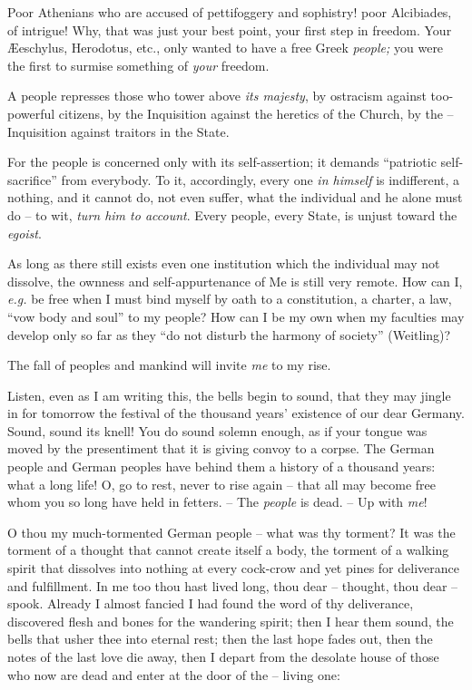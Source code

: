Poor Athenians who are accused of pettifoggery and sophistry! poor Alcibiades, 
of intrigue! Why, that was just your best point, your first step in freedom. 
Your \AE{}eschylus, Herodotus, etc., only wanted to have a free Greek 
\textit{people;} you were the first to surmise something of \textit{your} 
freedom.

A people represses those who tower above \textit{its majesty}, by ostracism 
against too-powerful citizens, by the Inquisition against the heretics of the 
Church, by the -- Inquisition against traitors in the State.

For the people is concerned only with its self-assertion; it demands 
``patriotic self-sacrifice'' from everybody. To it, accordingly, every one 
\textit{in himself} is indifferent, a nothing, and it cannot do, not even 
suffer, what the individual and he alone must do -- to wit, \textit{turn him 
to account}. Every people, every State, is unjust toward the \textit{egoist}.

As long as there still exists even one institution which the individual may 
not dissolve, the ownness and self-appurtenance of Me is still very remote. 
How can I, \textit{e.g.} be free when I must bind myself by oath to a 
constitution, a charter, a law, ``vow body and soul'' to my people? How can 
I be my own when my faculties may develop only so far as they ``do not 
disturb the harmony of society'' (Weitling)?

The fall of peoples and mankind will invite \textit{me} to my rise.

Listen, even as I am writing this, the bells begin to sound, that they may 
jingle in for tomorrow the festival of the thousand years' existence of our 
dear Germany. Sound, sound its knell! You do sound solemn enough, as if your 
tongue was moved by the presentiment that it is giving convoy to a corpse. The 
German people and German peoples have behind them a history of a thousand 
years: what a long life! O, go to rest, never to rise again -- that all may 
become free whom you so long have held in fetters. -- The \textit{people} is 
dead. -- Up with \textit{me}!

O thou my much-tormented German people -- what was thy torment? It was the 
torment of a thought that cannot create itself a body, the torment of a 
walking spirit that dissolves into nothing at every cock-crow and yet pines 
for deliverance and fulfillment. In me too thou hast lived long, thou dear -- 
thought, thou dear -- spook. Already I almost fancied I had found the word of 
thy deliverance, discovered flesh and bones for the wandering spirit; then I 
hear them sound, the bells that usher thee into eternal rest; then the last 
hope fades out, then the notes of the last love die away, then I depart from 
the desolate house of those who now are dead and enter at the door of the -- 
living one:

